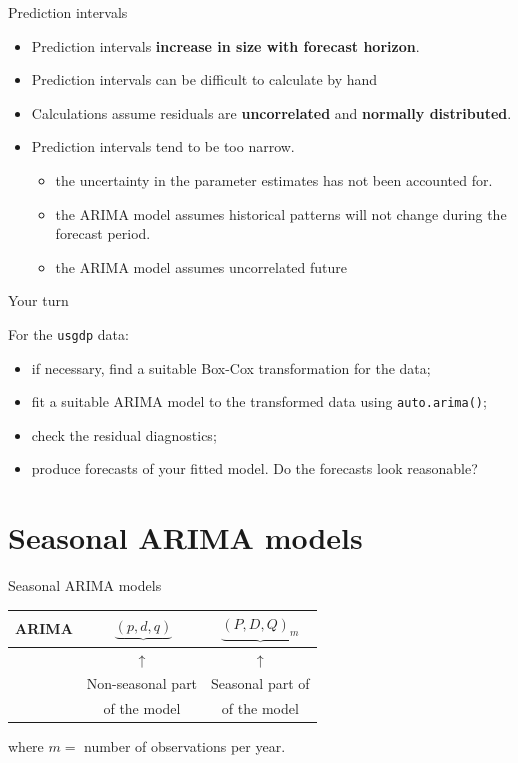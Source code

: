 \documentclass[14pt,ignorenonframetext,]{beamer}
\providecommand{\tightlist}{%
  \setlength{\itemsep}{0pt}\setlength{\parskip}{0pt}}
\begin{document}
\begin{frame}{Prediction intervals}

\begin{itemize}
\tightlist
\item
  Prediction intervals \textbf{increase in size with forecast horizon}.
\item
  Prediction intervals can be difficult to calculate by hand
\item
  Calculations assume residuals are \textbf{uncorrelated} and
  \textbf{normally distributed}.
\item
  Prediction intervals tend to be too narrow.

  \begin{itemize}
  \tightlist
  \item
    the uncertainty in the parameter estimates has not been accounted
    for.
  \item
    the ARIMA model assumes historical patterns will not change during
    the forecast period.
  \item
    the ARIMA model assumes uncorrelated future 
  \end{itemize}
\end{itemize}

\end{frame}

\begin{frame}[fragile]{Your turn}

For the \texttt{usgdp} data:

\begin{itemize}
\tightlist
\item
  if necessary, find a suitable Box-Cox transformation for the data;
\item
  fit a suitable ARIMA model to the transformed data using
  \texttt{auto.arima()};
\item
  check the residual diagnostics;
\item
  produce forecasts of your fitted model. Do the forecasts look
  reasonable?
\end{itemize}

\end{frame}

\section{Seasonal ARIMA models}\label{seasonal-arima-models}

\begin{frame}{Seasonal ARIMA models}

\begin{longtable}[]{@{}rcc@{}}
\toprule
ARIMA & \(~\underbrace{(p, d, q)}\) &
\(\underbrace{(P, D, Q)_{m}}\)\tabularnewline
\midrule
\endhead
& \({\uparrow}\) & \({\uparrow}\)\tabularnewline
& Non-seasonal part & Seasonal part of\tabularnewline
& of the model & of the model\tabularnewline
\bottomrule
\end{longtable}

where \(m =\) number of observations per year.

\end{frame}
\end{document}
